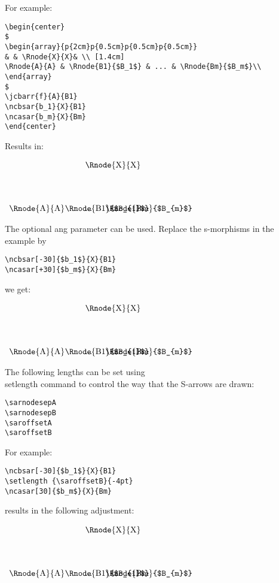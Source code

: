 \documentclass[10pt,a4paper]{article}
\begin{document}
\vspace{0.5cm}
\newpage
\noindent For example:
\begin{verbatim}
\begin{center}
$
\begin{array}{p{2cm}p{0.5cm}p{0.5cm}p{0.5cm}}
& & \Rnode{X}{X}& \\ [1.4cm]
\Rnode{A}{A} & \Rnode{B1}{$B_1$} & ... & \Rnode{Bm}{$B_m$}\\
\end{array}
$
\jcbarr{f}{A}{B1}
\ncbsar{b_1}{X}{B1}
\ncasar{b_m}{X}{Bm}
\end{center}
\end{verbatim}

\noindent Results in:
\begin{center}
$
\begin{array}{p{2cm}p{0.5cm}p{0.5cm}p{0.5cm}}
& & \Rnode{X}{X}& \\ [1.4cm]
\Rnode{A}{A} & \Rnode{B1}{$B_{1}$} & ... & \Rnode{Bm}{$B_{m}$}\\
\end{array}
$
\end{center}
\noindent The optional ang parameter can be used. Replace the s-morphisms in the example by
\begin{verbatim}
\ncbsar[-30]{$b_1$}{X}{B1}
\ncasar[+30]{$b_m$}{X}{Bm}
\end{verbatim}
we get:
\begin{center}
$
\begin{array}{p{2cm}p{0.5cm}p{0.5cm}p{0.5cm}}
& & \Rnode{X}{X}& \\ [1.4cm]
\Rnode{A}{A} & \Rnode{B1}{$B_{1}$} & ... & \Rnode{Bm}{$B_{m}$}\\
\end{array}
$
\end{center}
\noindent The following lengths can be set using \\setlength command to control the way that the S-arrows are drawn:
\begin{verbatim}
\sarnodesepA
\sarnodesepB
\saroffsetA
\saroffsetB
\end{verbatim}
For example:
\begin{verbatim}
\ncbsar[-30]{$b_1$}{X}{B1}
\setlength {\saroffsetB}{-4pt}
\ncasar[30]{$b_m$}{X}{Bm}
\end{verbatim}
\indent results in the following adjustment:
\begin{center}
$
\begin{array}{p{2cm}p{0.5cm}p{0.5cm}p{0.5cm}}
& & \Rnode{X}{X}& \\ [1.4cm]
\Rnode{A}{A} & \Rnode{B1}{$B_{1}$} & ... & \Rnode{Bm}{$B_{m}$}\\
\end{array}
$
\setlength {\saroffsetB}{-4pt}
\end{center}
\end{document}
